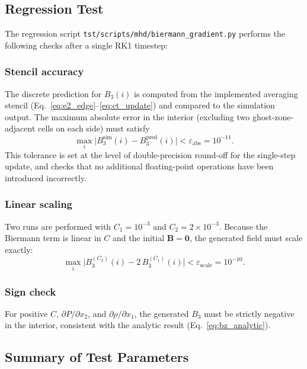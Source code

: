 \documentclass[11pt]{article}
\newcommand{\bv}[1]{\boldsymbol{#1}}
\begin{document}
\subsection{Regression Test}
\label{sec:regression}

The regression script \texttt{tst/scripts/mhd/biermann\_gradient.py}
performs the following checks after a single RK1 timestep:

\subsubsection*{Stencil accuracy}
The discrete prediction for $B_3(i)$ is computed from the implemented
averaging stencil (Eq.~\ref{eq:e2_edge}--\ref{eq:ct_update}) and compared to
the simulation output.  The maximum absolute error in the interior
(excluding two ghost-zone-adjacent cells on each side) must satisfy
\begin{equation}
  \max_i\bigl|B_3^{\mathrm{sim}}(i) - B_3^{\mathrm{pred}}(i)\bigr|
  < \varepsilon_\mathrm{abs} = 10^{-11}.
  \label{eq:err_tol}
\end{equation}
This tolerance is set at the level of double-precision round-off for the
single-step update, and checks that no additional floating-point operations
have been introduced incorrectly.

\subsubsection*{Linear scaling}
Two runs are performed with $C_1 = 10^{-3}$ and $C_2 = 2\times10^{-3}$.
Because the Biermann term is linear in $C$ and the initial $\bv{B}=\bv{0}$,
the generated field must scale exactly:
\begin{equation}
  \max_i\bigl|B_3^{(C_2)}(i) - 2\,B_3^{(C_1)}(i)\bigr|
  < \varepsilon_\mathrm{scale} = 10^{-10}.
  \label{eq:scale_tol}
\end{equation}

\subsubsection*{Sign check}
For positive $C$, $\partial P/\partial x_2$, and $\partial\rho/\partial x_1$,
the generated $B_3$ must be strictly negative in the interior, consistent
with the analytic result (Eq.~\ref{eq:bz_analytic}).

\subsection{Summary of Test Parameters}
\label{sec:params}
\end{document}
